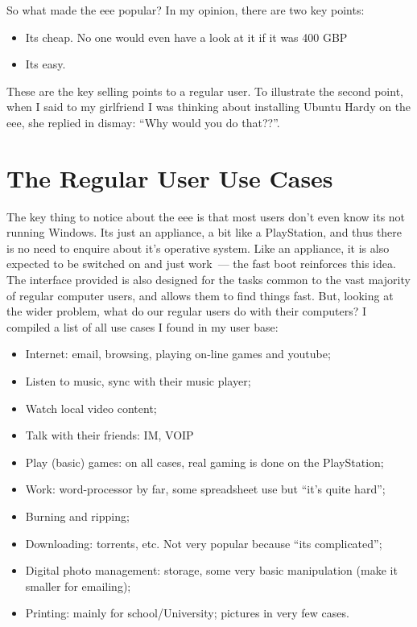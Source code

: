 \documentclass{memoir}
\begin{document}
So what made the eee popular? In my opinion, there are two key points:

\begin{itemize}
\item Its cheap. No one would even have a look at it if it was 400 GBP
\item Its easy.
\end{itemize}

These are the key selling points to a regular user. To illustrate the
second point, when I said to my girlfriend I was thinking about
installing Ubuntu Hardy on the eee, she replied in dismay: ``Why would
you do that??''.

\section{The Regular User Use Cases}

The key thing to notice about the eee is that most users don't even
know its not running Windows. Its just an appliance, a bit like a
PlayStation, and thus there is no need to enquire about it's operative
system. Like an appliance, it is also expected to be switched on and
just work~--- the fast boot reinforces this idea. The interface
provided is also designed for the tasks common to the vast majority of
regular computer users, and allows them to find things fast. But,
looking at the wider problem, what do our regular users do with their
computers?  I compiled a list of all use cases I found in my user
base:

\begin{itemize}
\item Internet: email, browsing, playing on-line games and youtube;
\item Listen to music, sync with their music player;
\item Watch local video content;
\item Talk with their friends: IM, VOIP
\item Play (basic) games: on all cases, real gaming is done on the
  PlayStation;
\item Work: word-processor by far, some spreadsheet use but ``it's
  quite hard'';
\item Burning and ripping;
\item Downloading: torrents, etc. Not very popular because ``its
  complicated'';
\item Digital photo management: storage, some very basic manipulation
  (make it smaller for emailing);
\item Printing: mainly for school/University; pictures in very few
  cases.
\end{itemize}
\end{document}

